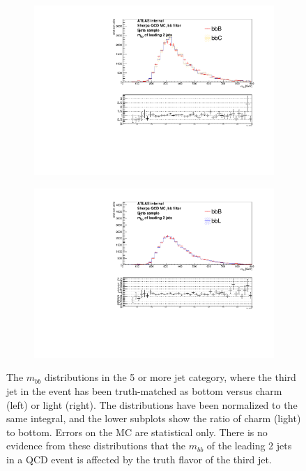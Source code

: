 \begin{figure}[phtb!]
  \begin{center}
  \begin{subfigure}[$BBB$ vs $BBC$, 5+ jet category]{0.45\textwidth}\includegraphics[width=\textwidth]{MonteCarlo/figures/mbb_bbB_5jets_bbB_bbC.pdf}\end{subfigure}
  \begin{subfigure}[$BBB$ vs $BBL$, 5+ jet category]{0.45\textwidth}\includegraphics[width=\textwidth]{MonteCarlo/figures/mbb_bbB_5jets_bbB_bbL.pdf}\end{subfigure}
  \caption{The $m_{bb}$ distributions in the 5 or more jet category, where the third jet in the event has been 
  truth-matched as bottom versus charm (left) or light (right).  The distributions have been normalized to 
  the same integral, and the lower subplots show the ratio of charm (light) to bottom.  Errors on the MC
  are statistical only.  There is no evidence from these distributions that the $m_{bb}$ of the leading
  2 jets in a QCD event is affected by the truth flavor of the third jet. 
  \label{fig:mbb_bb_qcd_mc}}
    \end{center}
\end{figure}










